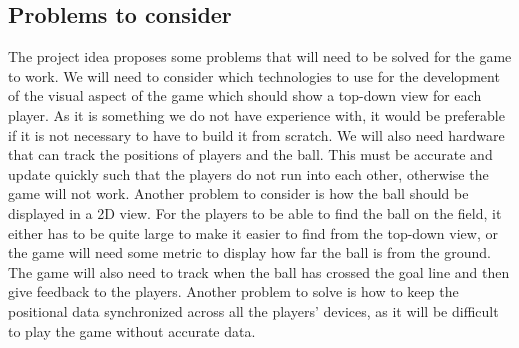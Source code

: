 \subsection{Problems to consider}
The project idea proposes some problems that will need to be solved for the game to work.
We will need to consider which technologies to use for the development of the visual aspect of the game which should show a top-down view for each player. 
As it is something we do not have experience with, it would be preferable if it is not necessary to have to build it from scratch.
We will also need hardware that can track the positions of players and the ball.
This must be accurate and update quickly such that the players do not run into each other, otherwise the game will not work.
Another problem to consider is how the ball should be displayed in a 2D view.
For the players to be able to find the ball on the field, it either has to be quite large to make it easier to find from the top-down view, or the game will need some metric to display how far the ball is from the ground.
The game will also need to track when the ball has crossed the goal line and then give feedback to the players.
Another problem to solve is how to keep the positional data synchronized across all the players' devices, as it will be difficult to play the game without accurate data.
